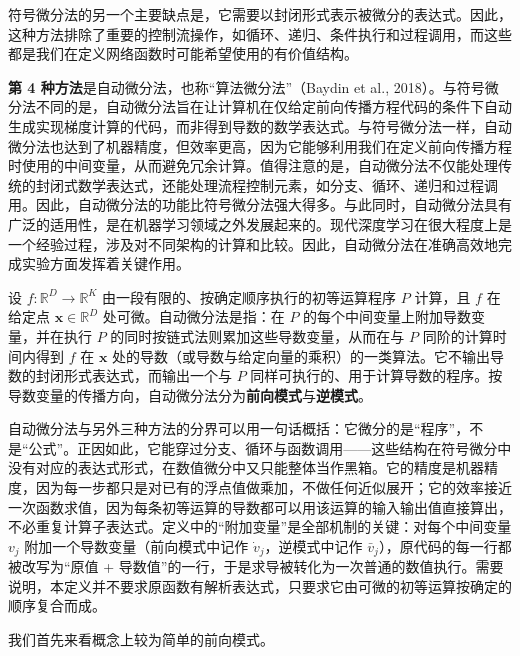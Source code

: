 \documentclass[../../main.tex]{subfiles}
\begin{document}
符号微分法的另一个主要缺点是，它需要以封闭形式表示被微分的表达式。因此，这种方法排除了重要的控制流操作，如循环、递归、条件执行和过程调用，而这些都是我们在定义网络函数时可能希望使用的有价值结构。

\textbf{第 4 种方法}是自动微分法，也称“算法微分法”（Baydin et al., 2018）。与符号微分法不同的是，自动微分法旨在让计算机在仅给定前向传播方程代码的条件下自动生成实现梯度计算的代码，而非得到导数的数学表达式。与符号微分法一样，自动微分法也达到了机器精度，但效率更高，因为它能够利用我们在定义前向传播方程时使用的中间变量，从而避免冗余计算。值得注意的是，自动微分法不仅能处理传统的封闭式数学表达式，还能处理流程控制元素，如分支、循环、递归和过程调用。因此，自动微分法的功能比符号微分法强大得多。与此同时，自动微分法具有广泛的适用性，是在机器学习领域之外发展起来的。现代深度学习在很大程度上是一个经验过程，涉及对不同架构的计算和比较。因此，自动微分法在准确高效地完成实验方面发挥着关键作用。

\begin{definition}[自动微分法]\label{definition:ch08-自动微分法}
设 $f:\mathbb{R}^{D}\to\mathbb{R}^{K}$ 由一段有限的、按确定顺序执行的初等运算程序 $P$ 计算，且 $f$ 在给定点 $\mathbf{x}\in\mathbb{R}^{D}$ 处可微。自动微分法是指：在 $P$ 的每个中间变量上附加导数变量，并在执行 $P$ 的同时按链式法则累加这些导数变量，从而在与 $P$ 同阶的计算时间内得到 $f$ 在 $\mathbf{x}$ 处的导数（或导数与给定向量的乘积）的一类算法。它不输出导数的封闭形式表达式，而输出一个与 $P$ 同样可执行的、用于计算导数的程序。按导数变量的传播方向，自动微分法分为\textbf{前向模式}与\textbf{逆模式}。
\end{definition}

\begin{remark}
自动微分法与另外三种方法的分界可以用一句话概括：它微分的是“程序”，不是“公式”。正因如此，它能穿过分支、循环与函数调用——这些结构在符号微分中没有对应的表达式形式，在数值微分中又只能整体当作黑箱。它的精度是机器精度，因为每一步都只是对已有的浮点值做乘加，不做任何近似展开；它的效率接近一次函数求值，因为每条初等运算的导数都可以用该运算的输入输出值直接算出，不必重复计算子表达式。定义中的“附加变量”是全部机制的关键：对每个中间变量 $v_j$ 附加一个导数变量（前向模式中记作 $\dot{v}_j$，逆模式中记作 $\bar{v}_j$），原代码的每一行都被改写为“原值 + 导数值”的一行，于是求导被转化为一次普通的数值执行。需要说明，本定义并不要求原函数有解析表达式，只要求它由可微的初等运算按确定的顺序复合而成。
\end{remark}

我们首先来看概念上较为简单的前向模式。
\end{document}
